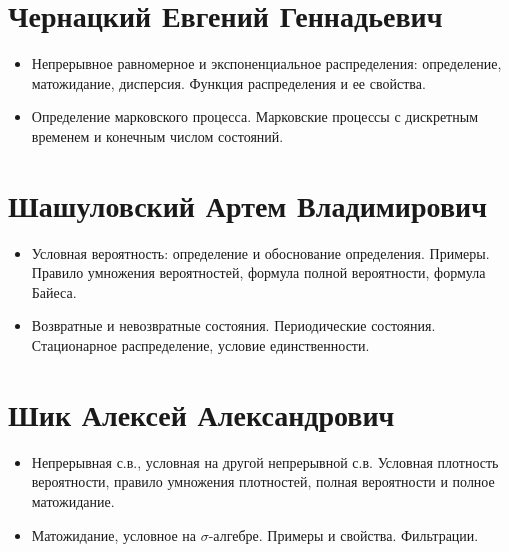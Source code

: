 \documentclass[12pt]{article}
\begin{document}
\section{Чернацкий Евгений Геннадьевич}

\begin{itemize}
  \item Непрерывное равномерное и экспоненциальное распределения: определение, матожидание, дисперсия. Функция распределения и ее свойства.
  \item Определение марковского процесса. Марковские процессы с дискретным временем и конечным числом состояний.
\end{itemize}

\section{Шашуловский Артем Владимирович}

\begin{itemize}
  \item Условная вероятность: определение и обоснование определения. Примеры. Правило умножения вероятностей, формула полной вероятности, формула Байеса.
  \item Возвратные и невозвратные состояния. Периодические состояния. Стационарное распределение, условие единственности. 
\end{itemize}

\section{Шик Алексей Александрович}

\begin{itemize}
  \item Непрерывная с.в., условная на другой непрерывной с.в. Условная плотность вероятности, правило умножения плотностей, полная вероятности и полное матожидание.
  \item Матожидание, условное на $\sigma$-алгебре. Примеры и свойства. Фильтрации.
\end{itemize}
\end{document}
